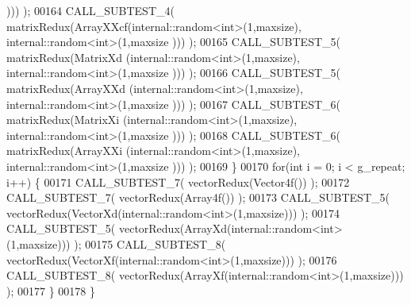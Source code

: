 \begin{DoxyCode}
      ))) );
00164     CALL\_SUBTEST\_4( matrixRedux(ArrayXXcf(internal::random<int>(1,maxsize), internal::random<int>(1,maxsize
      ))) );
00165     CALL\_SUBTEST\_5( matrixRedux(MatrixXd (internal::random<int>(1,maxsize), internal::random<int>(1,maxsize
      ))) );
00166     CALL\_SUBTEST\_5( matrixRedux(ArrayXXd (internal::random<int>(1,maxsize), internal::random<int>(1,maxsize
      ))) );
00167     CALL\_SUBTEST\_6( matrixRedux(MatrixXi (internal::random<int>(1,maxsize), internal::random<int>(1,maxsize
      ))) );
00168     CALL\_SUBTEST\_6( matrixRedux(ArrayXXi (internal::random<int>(1,maxsize), internal::random<int>(1,maxsize
      ))) );
00169   \}
00170   \textcolor{keywordflow}{for}(\textcolor{keywordtype}{int} i = 0; i < g\_repeat; i++) \{
00171     CALL\_SUBTEST\_7( vectorRedux(Vector4f()) );
00172     CALL\_SUBTEST\_7( vectorRedux(Array4f()) );
00173     CALL\_SUBTEST\_5( vectorRedux(VectorXd(internal::random<int>(1,maxsize))) );
00174     CALL\_SUBTEST\_5( vectorRedux(ArrayXd(internal::random<int>(1,maxsize))) );
00175     CALL\_SUBTEST\_8( vectorRedux(VectorXf(internal::random<int>(1,maxsize))) );
00176     CALL\_SUBTEST\_8( vectorRedux(ArrayXf(internal::random<int>(1,maxsize))) );
00177   \}
00178 \}
\end{DoxyCode}
